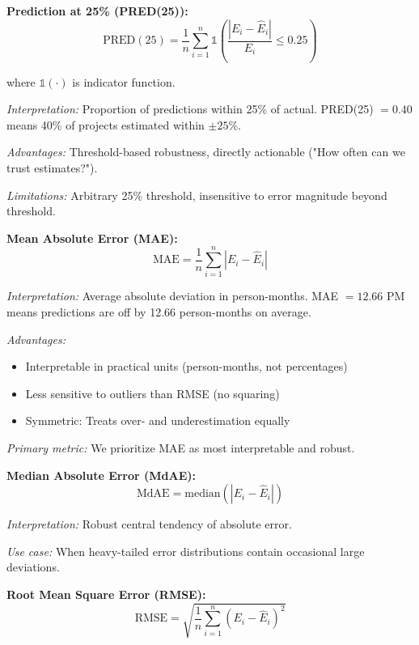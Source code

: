 \documentclass[11pt,a4paper]{article}
\begin{document}
\textbf{Prediction at 25\% (PRED(25)):}
\begin{equation}
\text{PRED}(25) = \frac{1}{n}\sum_{i=1}^{n}\mathbb{1}\left(\frac{|E_i - \hat{E}_i|}{E_i} \leq 0.25\right)
\label{eq:pred25}
\end{equation}

where $\mathbb{1}(\cdot)$ is indicator function.

\textit{Interpretation:} Proportion of predictions within 25\% of actual. PRED(25) $= 0.40$ means 40\% of projects estimated within $\pm 25$\%.

\textit{Advantages:} Threshold-based robustness, directly actionable ("How often can we trust estimates?").

\textit{Limitations:} Arbitrary 25\% threshold, insensitive to error magnitude beyond threshold.

\textbf{Mean Absolute Error (MAE):}
\begin{equation}
\text{MAE} = \frac{1}{n}\sum_{i=1}^{n}|E_i - \hat{E}_i|
\label{eq:mae}
\end{equation}

\textit{Interpretation:} Average absolute deviation in person-months. MAE $= 12.66$ PM means predictions are off by 12.66 person-months on average.

\textit{Advantages:} 
\begin{itemize}
    \item Interpretable in practical units (person-months, not percentages)
    \item Less sensitive to outliers than RMSE (no squaring)
    \item Symmetric: Treats over- and underestimation equally
\end{itemize}

\textit{Primary metric:} We prioritize MAE as most interpretable and robust.

\textbf{Median Absolute Error (MdAE):}
\begin{equation}
\text{MdAE} = \text{median}\left(|E_i - \hat{E}_i|\right)
\label{eq:mdae}
\end{equation}

\textit{Interpretation:} Robust central tendency of absolute error.

\textit{Use case:} When heavy-tailed error distributions contain occasional large deviations.

\textbf{Root Mean Square Error (RMSE):}
\begin{equation}
\text{RMSE} = \sqrt{\frac{1}{n}\sum_{i=1}^{n}(E_i - \hat{E}_i)^2}
\label{eq:rmse}
\end{equation}
\end{document}
